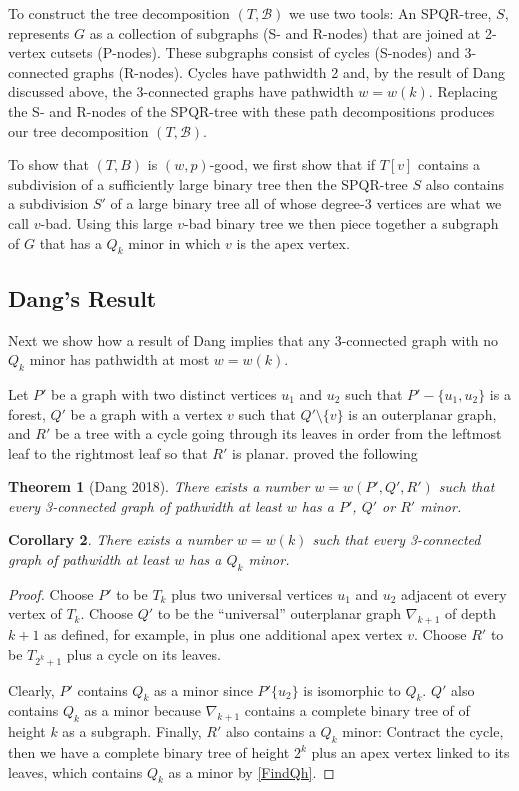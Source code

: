 \documentclass[a4paper,11pt]{article}
\theoremstyle{plain}
\newtheorem{theorem}{Theorem}
\newtheorem{corollary}[theorem]{Corollary}
\theoremstyle{definition}
\begin{document}
To construct the tree decomposition $(T,\mathcal{B})$ we use two tools:
An SPQR-tree, $S$, represents $G$ as a collection of subgraphs (S- and
R-nodes) that are joined at 2-vertex cutsets (P-nodes).  These subgraphs
consist of cycles (S-nodes) and 3-connected graphs (R-nodes). Cycles have
pathwidth 2 and, by the result of Dang discussed above, the 3-connected
graphs have pathwidth $w=w(k)$. Replacing the S- and R-nodes of the
SPQR-tree with these path decompositions produces our tree decomposition
$(T,\mathcal{B})$.

To show that $(T,B)$ is $(w,p)$-good, we first show that if $T[v]$
contains a subdivision of a sufficiently large binary tree then the
SPQR-tree $S$ also contains a subdivision $S'$ of a large binary tree
all of whose degree-3 vertices are what we call $v$-bad.  Using this
large $v$-bad binary tree we then piece together a subgraph of $G$ that
has a $Q_k$ minor in which $v$ is the apex vertex.

\subsection{Dang's Result}

Next we show how a result of Dang implies that any 3-connected graph with no $Q_k$ minor has pathwidth at most $w=w(k)$.

Let $P'$ be a graph with two distinct vertices $u_1$ and $u_2$ such
that $P'-\{u_1,u_2\}$ is a forest, $Q'$ be a graph with a vertex $v$
such that $Q'\setminus\{v\}$ is an outerplanar graph, and $R'$ be a tree
with a cycle going through its leaves in order from the leftmost leaf to
the rightmost leaf so that $R'$ is planar. \citet[Theorem 1.1.5]{Dang18}
proved the following

\begin{theorem}[Dang 2018]
\label{dang-theorem}
There exists a number $w = w(P ', Q' , R')$ such that every 3-connected graph
of pathwidth at least $w$ has a $P'$, $Q'$ or $R'$ minor.
\end{theorem} 

\begin{corollary}\label{3-connected}
  There exists a number $w=w(k)$ such that every 3-connected graph of pathwidth at least $w$ has a $Q_k$ minor.
\end{corollary}

\begin{proof}
Choose $P'$ to be $T_k$ plus 
two universal vertices $u_1$ and $u_2$ adjacent ot every vertex of $T_k$. Choose $Q'$ to be the ``universal''
outerplanar graph $\nabla_{k+1}$ of depth $k+1$ as defined, for example, in
\citet{} plus one additional apex vertex $v$.
Choose $R'$ to be $T_{2^k +1}$ plus a
cycle on its leaves.

Clearly, $P'$ contains $Q_k$ as a minor since $P'\{u_2\}$ is isomorphic
to $Q_k$.
$Q'$ also contains $Q_k$ as a minor because $\nabla_{k+1}$ contains a complete binary tree of of height
$k$ as a subgraph. Finally, $R'$ also contains a $Q_k$ minor: Contract the cycle, then we
have a complete binary tree of height $2^k$ plus an apex vertex linked
to its leaves, which contains $Q_k$ as a minor by \cref{FindQh}.
\end{proof}
\end{document}
